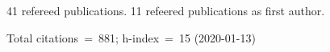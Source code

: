 41 refereed publications. 11 refeered publications as first author.

Total citations~=~881; h-index~=~15 (2020-01-13)